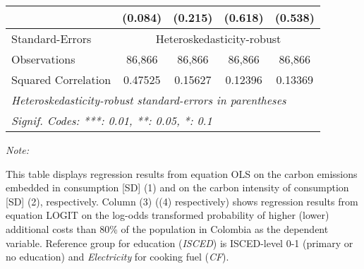 \begin{table}[htbp!]
\begin{adjustbox}{width = 1\textwidth, max height = 0.95\textheight, center}
\begin{threeparttable}[b]
\begin{tabular}{lcccc}
                                 & (0.084)            & (0.215)            & (0.618)        & (0.538)\\   
            \midrule 
            Standard-Errors & \multicolumn{4}{c}{Heteroskedasticity-robust} \\ 
            Observations         & 86,866             & 86,866             & 86,866         & 86,866\\  
            Squared Correlation  & 0.47525            & 0.15627            & 0.12396        & 0.13369\\  
            \midrule \midrule
            \multicolumn{5}{l}{\emph{Heteroskedasticity-robust standard-errors in parentheses}}\\
            \multicolumn{5}{l}{\emph{Signif. Codes: ***: 0.01, **: 0.05, *: 0.1}}\\
         \end{tabular}
         
         \begin{tablenotes}\item \medskip \textit{Note:}
            \item This table displays regression results from equation OLS on the carbon emissions embedded in consumption [SD] (1) and on the carbon intensity of consumption [SD] (2), respectively. 
                                      Column (3) ((4) respectively) shows regression results from equation LOGIT on the log-odds transformed probability of higher (lower) additional costs than 80\% of the population in Colombia as the dependent variable. Reference group for education (\textit{ISCED}) is ISCED-level 0-1 (primary or no education) and \textit{Electricity} for cooking fuel (\textit{CF}).
         \end{tablenotes}
      \end{threeparttable}
   \end{adjustbox}
\end{table}



